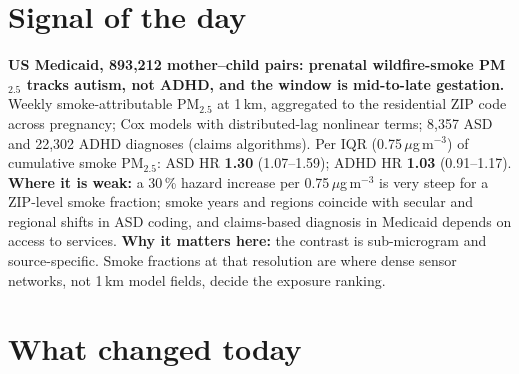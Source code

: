 \documentclass[10pt]{article}
\begin{document}
\vspace{6mm}

\section*{\sffamily\bfseries\color{Deep}Signal of the day}
\vspace{-1.5mm}{\color{Amber}\rule{\linewidth}{1.1pt}}\vspace{2.5mm}

\begin{keybox}
{\sffamily\bfseries\small\color{Deep}US Medicaid, 893,212 mother--child pairs: prenatal wildfire-smoke
PM$_{2.5}$ tracks autism, not ADHD, and the window is mid-to-late gestation.}\\[1.4mm]
\footnotesize
Weekly smoke-attributable PM$_{2.5}$ at 1\,km, aggregated to the residential ZIP code across pregnancy; Cox models with
distributed-lag nonlinear terms; 8,357 ASD and 22,302 ADHD diagnoses (claims algorithms). Per IQR (0.75\,$\mu$g\,m$^{-3}$)
of cumulative smoke PM$_{2.5}$: ASD HR \textbf{1.30} (1.07--1.59); ADHD HR \textbf{1.03} (0.91--1.17).
\textbf{Where it is weak:} a 30\,\% hazard increase per 0.75\,$\mu$g\,m$^{-3}$ is very steep for a ZIP-level smoke
fraction; smoke years and regions coincide with secular and regional shifts in ASD coding, and claims-based diagnosis in
Medicaid depends on access to services.
\textbf{Why it matters here:} the contrast is sub-microgram and source-specific. Smoke fractions at that resolution are
where dense sensor networks, not 1\,km model fields, decide the exposure ranking.\par
\end{keybox}

\vspace{3mm}

\section*{\sffamily\bfseries\color{Deep}What changed today}
\vspace{-1.5mm}{\color{Amber}\rule{\linewidth}{1.1pt}}\vspace{2.5mm}
\end{document}

